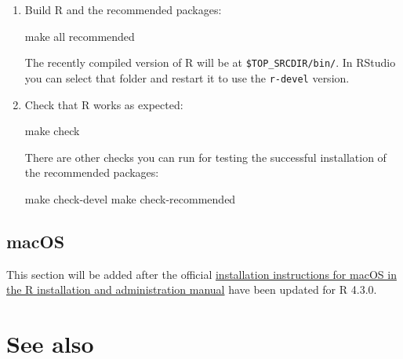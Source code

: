 \documentclass[
]{book}
\newenvironment{Shaded}{\begin{snugshade}}{\end{snugshade}}
\newcommand{\BuiltInTok}[1]{#1}
\newcommand{\FunctionTok}[1]{\textcolor[rgb]{0.00,0.00,0.00}{#1}}
\newcommand{\NormalTok}[1]{#1}
\newcommand{\StringTok}[1]{\textcolor[rgb]{0.31,0.60,0.02}{#1}}
\newcommand{\VariableTok}[1]{\textcolor[rgb]{0.00,0.00,0.00}{#1}}
\begin{document}
\begin{enumerate}
\begin{Shaded}
\end{Shaded}
\item
  Build R and the recommended packages:

\begin{Shaded}
\begin{Highlighting}[]
\FunctionTok{make}\NormalTok{ all recommended}
\end{Highlighting}
\end{Shaded}

  The recently compiled version of R will be at \texttt{\$TOP\_SRCDIR/bin/}.
  In RStudio you can select that folder and restart it to use the \texttt{r-devel} version.
\item
  Check that R works as expected:

\begin{Shaded}
\begin{Highlighting}[]
\FunctionTok{make}\NormalTok{ check}
\end{Highlighting}
\end{Shaded}

  There are other checks you can run for testing the successful installation of the recommended packages:

\begin{Shaded}
\begin{Highlighting}[]
\FunctionTok{make}\NormalTok{ check{-}devel}
\FunctionTok{make}\NormalTok{ check{-}recommended}
\end{Highlighting}
\end{Shaded}
\end{enumerate}

\hypertarget{macos}{%
\subsection{macOS}\label{macos}}

This section will be added after the official \href{https://cran.r-project.org/doc/manuals/r-devel/R-admin.html\#macOS}{installation instructions for macOS in the R installation and administration manual} have been updated for R 4.3.0.

\hypertarget{see-also}{%
\section{See also}\label{see-also}}
\end{document}
